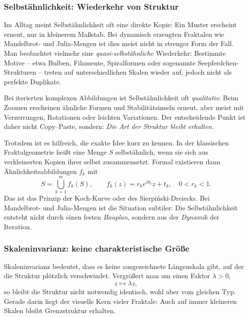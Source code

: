 \subsubsection*{Selbstähnlichkeit: Wiederkehr von Struktur}

Im Alltag meint Selbstähnlichkeit oft eine direkte Kopie:
Ein Muster erscheint erneut, nur in kleinerem Maßstab.
Bei dynamisch erzeugten Fraktalen wie Mandelbrot- und Julia-Mengen ist dies meist nicht in strenger Form der Fall.
Man beobachtet vielmehr eine \emph{quasi-selbstähnliche} Wiederkehr:
Bestimmte Motive -- etwa Bulben, Filamente, Spiralformen oder sogenannte \glqq Seepferdchen\grqq-Strukturen --
treten auf unterschiedlichen Skalen wieder auf,
jedoch nicht als perfekte Duplikate.

\begin{DidacticBox}
\label{box:kopie}
\small
Bei iterierten komplexen Abbildungen ist Selbstähnlichkeit oft \emph{qualitativ}:
Beim Zoomen erscheinen ähnliche Formen und Stabilitätsinseln erneut,
aber meist mit Verzerrungen, Rotationen oder leichten Variationen.
Der entscheidende Punkt ist daher nicht \glqq Copy--Paste\grqq,
sondern:
\emph{Die Art der Struktur bleibt erhalten.}
\end{DidacticBox}

Trotzdem ist es hilfreich, die exakte Idee kurz zu kennen.
In der klassischen Fraktalgeometrie heißt eine Menge $S$ selbstähnlich,
wenn sie sich aus verkleinerten Kopien ihrer selbst zusammensetzt.
Formal existieren dann Ähnlichkeitsabbildungen $f_k$ mit
\[
S=\bigcup_{k=1}^m f_k(S),\qquad
f_k(z)=r_k e^{i\theta_k}z+t_k,\quad 0<r_k<1.
\]
Das ist das Prinzip der Koch-Kurve oder des Sierpiński-Dreiecks.
Bei Mandelbrot- und Julia-Mengen ist die Situation subtiler:
Die Selbstähnlichkeit entsteht nicht durch einen festen \emph{Bauplan},
sondern aus der \emph{Dynamik} der Iteration.

\subsubsection*{Skaleninvarianz: keine charakteristische Größe}

Skaleninvarianz bedeutet,
dass es keine ausgezeichnete Längenskala gibt,
auf der die Struktur plötzlich verschwindet.
Vergrößert man um einen Faktor $\lambda>0$,
\[
z \mapsto \lambda z,
\]
so bleibt die Struktur nicht notwendig identisch,
wohl aber vom gleichen Typ.
Gerade darin liegt der visuelle Kern vieler Fraktale:
Auch auf immer kleineren Skalen bleibt Grenzstruktur erhalten.

